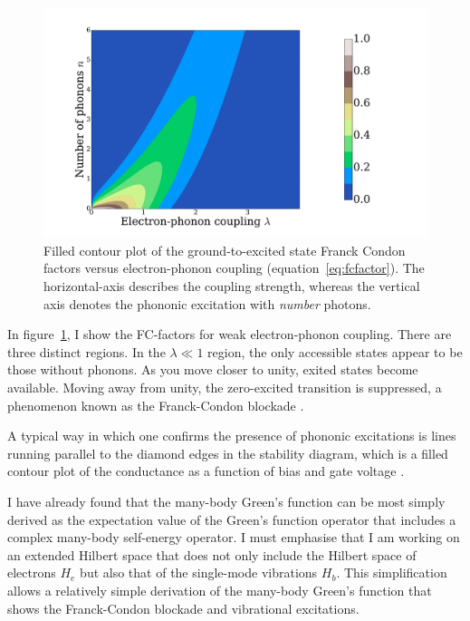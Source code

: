 \begin{figure}[!bp]
    \centering
    \includegraphics[height=.3\textheight]{pdf/doodling.pdf}
    \caption{Filled contour plot of the ground-to-excited state Franck Condon factors versus electron-phonon coupling (equation~\ref{eq:fcfactor}). The horizontal-axis describes the coupling strength, whereas the vertical axis denotes the phononic excitation with \emph{number} photons.}
    \label{fig:fc}
\end{figure}

In figure~\ref{fig:fc}, I show the FC-factors for weak electron-phonon coupling. There are three distinct regions. In the $\lambda\ll 1$ region, the only accessible states appear to be those without phonons. As you move closer to unity, exited states become available. Moving away from unity, the zero-excited transition is suppressed, a phenomenon known as the Franck-Condon blockade \cite{fcblockade}.

A typical way in which one confirms the presence of phononic excitations is lines running parallel to the diamond edges in the stability diagram, which is a filled contour plot of the conductance as a function of bias and gate voltage \cite{vibrationcomputation}.

I have already found that the many-body Green's function can be most simply derived as the expectation value of the Green's function operator that includes a complex many-body self-energy operator. I must emphasise that I am working on an extended Hilbert space that does not only include the Hilbert space of electrons $H_e$ but also that of the single-mode vibrations $H_b$. This simplification allows a relatively simple derivation of the many-body Green's function that shows the Franck-Condon blockade and vibrational excitations.  

